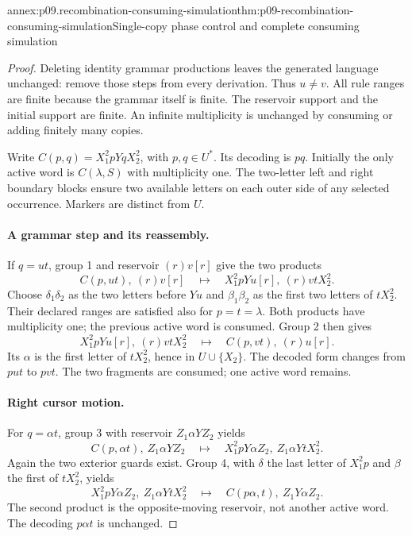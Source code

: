 \begin{annexitem}{annex:p09.recombination-consuming-simulation}{thm:p09-recombination-consuming-simulation}{Single-copy phase control and complete consuming simulation}
\begin{proof}
Deleting identity grammar productions leaves the generated language
unchanged: remove those steps from every derivation. Thus \(u\ne v\).
All rule ranges are finite because the grammar itself is finite.
The reservoir support
and the initial support are finite. An infinite multiplicity is unchanged
by consuming or adding finitely many copies.

Write \(C(p,q)=X_1^2pYqX_2^2\), with \(p,q\in U^*\).
Its decoding is \(pq\). Initially the only active word is \(C(\lambda,S)\)
with multiplicity one. The two-letter left and right boundary blocks
ensure two available letters on each outer side of any selected occurrence.
Markers are distinct from \(U\).

\paragraph{A grammar step and its reassembly.}
If \(q=ut\), group 1 and reservoir \((r)v[r]\) give the two products
\[
 C(p,ut),\ (r)v[r]
 \quad\longmapsto\quad
 X_1^2pYu[r],\ (r)vtX_2^2.
\]
Choose \(\delta_1\delta_2\) as the two letters before \(Yu\) and
\(\beta_1\beta_2\) as the first two letters of \(tX_2^2\).
Their declared ranges are satisfied also for \(p=t=\lambda\).
Both products have multiplicity one; the previous active word is consumed.
Group 2 then gives
\[
 X_1^2pYu[r],\ (r)vtX_2^2
 \quad\longmapsto\quad
 C(p,vt),\ (r)u[r].
\]
Its \(\alpha\) is the first letter of \(tX_2^2\), hence in
\(U\cup\{X_2\}\). The decoded form changes from \(put\) to \(pvt\).
The two fragments are consumed; one active word remains.

\paragraph{Right cursor motion.}
For \(q=\alpha t\), group 3 with reservoir \(Z_1\alpha YZ_2\) yields
\[
 C(p,\alpha t),\ Z_1\alpha YZ_2
 \quad\longmapsto\quad
 X_1^2pY\alpha Z_2,\ Z_1\alpha YtX_2^2.
\]
Again the two exterior guards exist. Group 4, with \(\delta\) the last
letter of \(X_1^2p\) and \(\beta\) the first of \(tX_2^2\), yields
\[
 X_1^2pY\alpha Z_2,\ Z_1\alpha YtX_2^2
 \quad\longmapsto\quad
 C(p\alpha,t),\ Z_1Y\alpha Z_2.
\]
The second product is the opposite-moving reservoir, not another active
word. The decoding \(p\alpha t\) is unchanged.


\end{proof}
\end{annexitem}
